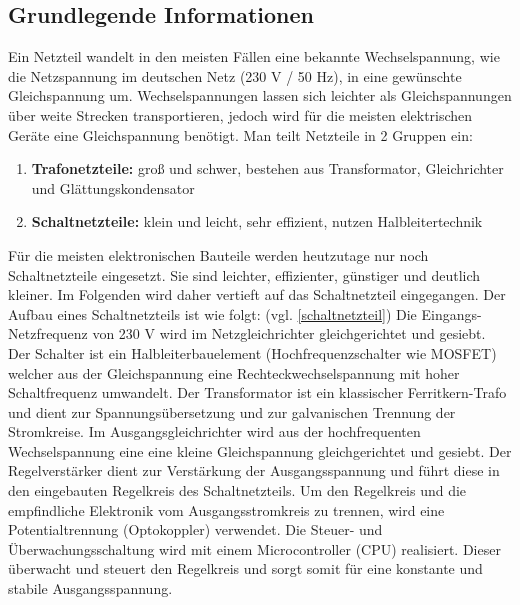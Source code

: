 \subsection{Grundlegende Informationen}
Ein Netzteil wandelt in den meisten Fällen eine bekannte Wechselspannung, wie die Netzspannung im deutschen Netz (230 V / 50 Hz), in eine gewünschte Gleichspannung um. Wechselspannungen lassen sich leichter als Gleichspannungen über weite Strecken transportieren, jedoch wird für die meisten elektrischen Geräte eine Gleichspannung benötigt. 
Man teilt Netzteile in 2 Gruppen ein: \cite{Hering:2024}
\begin{enumerate}
	\item \textbf{Trafonetzteile:} groß und schwer, bestehen aus Transformator, Gleichrichter und Glättungskondensator
	\item \textbf{Schaltnetzteile:} klein und leicht, sehr effizient, nutzen Halbleitertechnik
\end{enumerate}
Für die meisten elektronischen Bauteile werden heutzutage nur noch Schaltnetzteile eingesetzt. Sie sind leichter, effizienter, günstiger und deutlich kleiner. Im Folgenden wird daher vertieft auf das Schaltnetzteil eingegangen.\cite{Haeberle:2018} Der Aufbau eines Schaltnetzteils ist wie folgt: (vgl. \ref{schaltnetzteil}) Die Eingangs-Netzfrequenz von 230 V wird im Netzgleichrichter gleichgerichtet und gesiebt. Der Schalter ist ein Halbleiterbauelement (Hochfrequenzschalter wie MOSFET) welcher aus der Gleichspannung eine Rechteckwechselspannung mit hoher Schaltfrequenz umwandelt. Der Transformator ist ein klassischer Ferritkern-Trafo und dient zur Spannungsübersetzung und zur galvanischen Trennung der Stromkreise. Im Ausgangsgleichrichter wird aus der hochfrequenten Wechselspannung eine eine kleine Gleichspannung gleichgerichtet und gesiebt. Der Regelverstärker dient zur Verstärkung der Ausgangsspannung und führt diese in den eingebauten Regelkreis des Schaltnetzteils. Um den Regelkreis und die empfindliche Elektronik vom Ausgangsstromkreis zu trennen, wird eine Potentialtrennung (Optokoppler) verwendet. Die Steuer- und Überwachungsschaltung wird mit einem Microcontroller (CPU) realisiert. Dieser überwacht und steuert den Regelkreis und sorgt somit für eine konstante und stabile Ausgangsspannung. \cite{Haeberle:2018}


